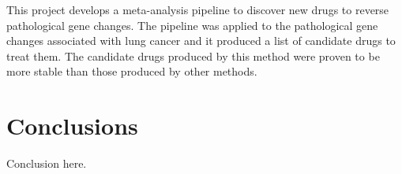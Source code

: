 \documentclass{sig-alternate-05-2015}
\begin{document}
This project develops a meta-analysis pipeline to discover new drugs to reverse
pathological gene changes. The pipeline was applied to the pathological gene
changes associated with lung cancer and it produced a list of candidate drugs
to treat them. The candidate drugs produced by this method were proven to be
more stable than those produced by other methods.

\section{Conclusions}
Conclusion here.
\end{document}

